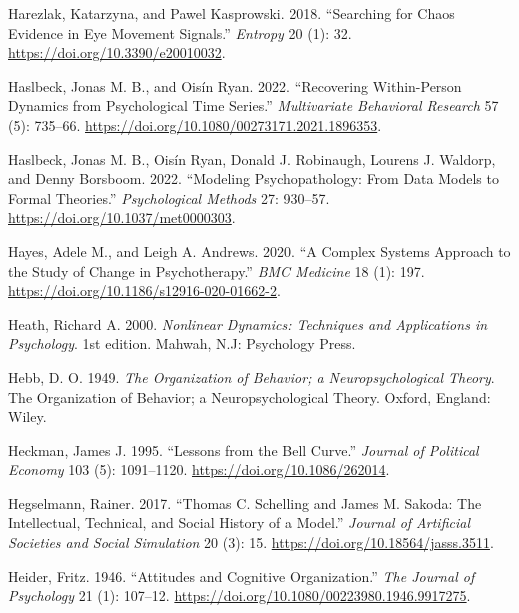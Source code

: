 \documentclass[
  a4paper,
  DIV=11,
  numbers=noendperiod,
  oneside]{scrreprt}
\newlength{\cslhangindent}
\newlength{\cslentryspacingunit} %
\newenvironment{CSLReferences}[2] %
 {%
  \setlength{\parindent}{0pt}
  \ifodd #1
  \let\oldpar\par
  \def\par{\hangindent=\cslhangindent\oldpar}
  \fi
  \setlength{\parskip}{#2\cslentryspacingunit}
 }%
 {}
\begin{document}
\begin{CSLReferences}{1}{0}
\leavevmode{}%
Harezlak, Katarzyna, and Pawel Kasprowski. 2018. {``Searching for Chaos
Evidence in Eye Movement Signals.''} \emph{Entropy} 20 (1): 32.
\url{https://doi.org/10.3390/e20010032}.

\leavevmode{}%
Haslbeck, Jonas M. B., and Oisín Ryan. 2022. {``Recovering
{Within-Person Dynamics} from {Psychological Time Series}.''}
\emph{Multivariate Behavioral Research} 57 (5): 735--66.
\url{https://doi.org/10.1080/00273171.2021.1896353}.

\leavevmode{}%
Haslbeck, Jonas M. B., Oisín Ryan, Donald J. Robinaugh, Lourens J.
Waldorp, and Denny Borsboom. 2022. {``Modeling Psychopathology: {From}
Data Models to Formal Theories.''} \emph{Psychological Methods} 27:
930--57. \url{https://doi.org/10.1037/met0000303}.

\leavevmode{}%
Hayes, Adele M., and Leigh A. Andrews. 2020. {``A Complex Systems
Approach to the Study of Change in Psychotherapy.''} \emph{BMC Medicine}
18 (1): 197. \url{https://doi.org/10.1186/s12916-020-01662-2}.

\leavevmode{}%
Heath, Richard A. 2000. \emph{Nonlinear {Dynamics}: {Techniques} and
{Applications} in {Psychology}}. 1st edition. {Mahwah, N.J}: {Psychology
Press}.

\leavevmode{}%
Hebb, D. O. 1949. \emph{The Organization of Behavior; a
Neuropsychological Theory}. The Organization of Behavior; a
Neuropsychological Theory. {Oxford, England}: {Wiley}.

\leavevmode{}%
Heckman, James J. 1995. {``Lessons from the {Bell Curve}.''}
\emph{Journal of Political Economy} 103 (5): 1091--1120.
\url{https://doi.org/10.1086/262014}.

\leavevmode{}%
Hegselmann, Rainer. 2017. {``Thomas {C}. {Schelling} and {James M}.
{Sakoda}: {The Intellectual}, {Technical}, and {Social History} of a
{Model}.''} \emph{Journal of Artificial Societies and Social Simulation}
20 (3): 15. \url{https://doi.org/10.18564/jasss.3511}.

\leavevmode{}%
Heider, Fritz. 1946. {``Attitudes and {Cognitive Organization}.''}
\emph{The Journal of Psychology} 21 (1): 107--12.
\url{https://doi.org/10.1080/00223980.1946.9917275}.


\end{CSLReferences}
\end{document}

